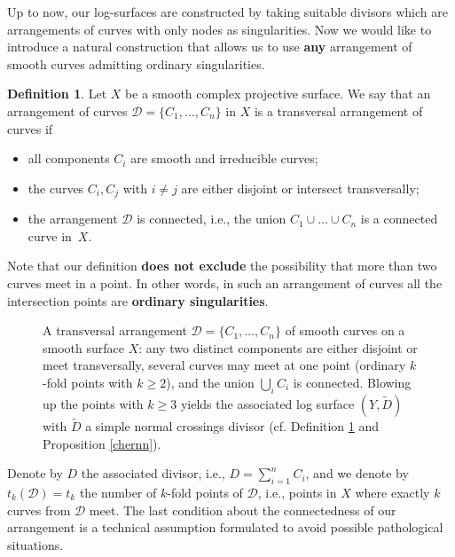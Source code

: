 \documentclass{article}
\theoremstyle{plain}
\theoremstyle{definition}
\newtheorem{definition}[thm]{Definition}
\numberwithin{equation}{section}
\begin{document}
Up to now, our log-surfaces are constructed by taking suitable divisors which are arrangements of curves with only nodes as singularities. Now we would like to introduce a natural construction that allows us to use \textbf{any} arrangement of smooth curves admitting ordinary singularities.
\begin{definition}\label{def:trans}
Let $X$ be a smooth complex projective surface. We say that an arrangement of curves $\mathcal{D} = \{C_{1}, \ldots, C_{n}\}$ in $X$ is a transversal arrangement of curves if
\begin{itemize}
\item all components $C_{i}$ are smooth and irreducible curves;
\item the curves $C_{i}, C_{j}$ with $i\neq j$ are either disjoint or intersect transversally;
\item the arrangement $\mathcal{D}$ is connected, i.e., the union $C_{1} \cup \ldots \cup C_{n}$ is a connected curve in~$X$.
\end{itemize}
\end{definition}
Note that our definition \textbf{does not exclude} the possibility that more than two curves meet in a point. In other words, in such an arrangement of curves all the intersection points are \textbf{ordinary singularities}.

\begin{figure}[h]
\centering
{}
\caption{A transversal arrangement $\mathcal{D}=\{C_1,\dots,C_n\}$ of smooth curves on a smooth surface $X$: any two distinct components are either disjoint or meet transversally, several curves may meet at one point (ordinary $k$-fold points with $k\ge2$), and the union $\bigcup_i C_i$ is connected. Blowing up the points with $k\ge3$ yields the associated log surface $(Y,\widetilde D)$ with $\widetilde D$ a simple normal crossings divisor (cf. Definition \ref{def:trans} and Proposition \ref{chernn}).}
\end{figure}

Denote by $D$ the associated divisor, i.e., $D=\sum_{i=1}^{n} C_{i}$, and we denote by $t_{k}(\mathcal{D})=t_{k}$ the number of $k$-fold points of $\mathcal{D}$, i.e., points in $X$ where exactly $k$ curves from $\mathcal{D}$ meet. The last condition about the connectedness of our arrangement is a technical assumption formulated to avoid possible pathological situations.
\end{document}

